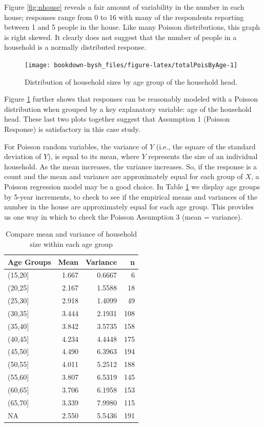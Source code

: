 \documentclass[
]{krantz}
\begin{document}
Figure \ref{fig:nhouse} reveals a fair amount of variability in the number in each house; responses range from 0 to 16 with many of the respondents reporting between 1 and 5 people in the house. Like many Poisson distributions, this graph is right skewed. It clearly does not suggest that the number of people in a household is a normally distributed response.

\begin{figure}

{\centering \texttt{[image: bookdown-bysh\_files/figure-latex/totalPoisByAge-1]} 

}

\caption{Distribution of household sizes by age group of the household head.}\label{fig:totalPoisByAge}
\end{figure}

Figure \ref{fig:totalPoisByAge} further shows that responses can be reasonably modeled with a Poisson distribution when grouped by a key explanatory variable: age of the household head. These last two plots together suggest that Assumption 1 (Poisson Response) is satisfactory in this case study.

For Poisson random variables, the variance of \(Y\) (i.e., the square of the standard deviation of \(Y\)), is equal to its mean, where \(Y\) represents the size of an individual household. As the mean increases, the variance increases. So, if the response is a count and the mean and variance are approximately equal for each group of \(X\), a Poisson regression model may be a good choice. In Table \ref{tab:table1chp4} we display age groups by 5-year increments, to check to see if the empirical means and variances of the number in the house are approximately equal for each age group. This provides us one way in which to check the Poisson Assumption 3 (mean = variance).

\begin{table}

\caption{\label{tab:table1chp4}Compare mean and variance of household size within each age group}
\centering
\begin{tabular}[t]{lrrr}
\toprule
Age Groups & Mean & Variance & n\\
\midrule
(15,20] & 1.667 & 0.6667 & 6\\
(20,25] & 2.167 & 1.5588 & 18\\
(25,30] & 2.918 & 1.4099 & 49\\
(30,35] & 3.444 & 2.1931 & 108\\
(35,40] & 3.842 & 3.5735 & 158\\
\addlinespace
(40,45] & 4.234 & 4.4448 & 175\\
(45,50] & 4.490 & 6.3963 & 194\\
(50,55] & 4.011 & 5.2512 & 188\\
(55,60] & 3.807 & 6.5319 & 145\\
(60,65] & 3.706 & 6.1958 & 153\\
\addlinespace
(65,70] & 3.339 & 7.9980 & 115\\
NA & 2.550 & 5.5436 & 191\\
\bottomrule
\end{tabular}
\end{table}
\end{document}
